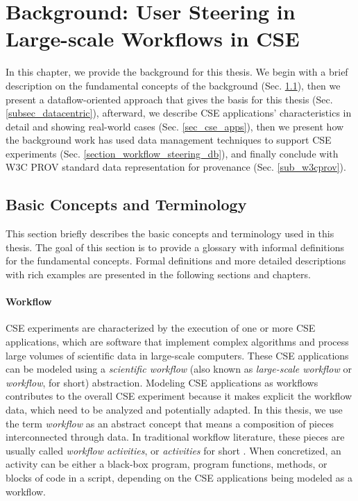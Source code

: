 \chapter{Background: User Steering in Large-scale Workflows in CSE}
\label{chap2}


In this chapter, we provide the background for this thesis.
We begin with a brief description on the fundamental concepts
of the background (Sec. \ref{chap2_sec_basic_concepts}),
then we present a dataflow-oriented approach that gives
the basis for this thesis (Sec. \ref{subsec_datacentric}),
afterward, we describe CSE applications' characteristics in detail and showing real-world cases (Sec. \ref{sec_cse_apps}), then we present how the background work
has used data management techniques to support CSE experiments (Sec. \ref{section_workflow_steering_db}), and finally conclude with W3C PROV standard data representation for provenance (Sec. \ref{sub_w3cprov}).


\section{Basic Concepts and Terminology}
\label{chap2_sec_basic_concepts}

This section briefly describes the basic concepts and terminology used in this thesis. The goal of this section is to provide a glossary with informal definitions for the fundamental concepts. Formal definitions and more detailed descriptions with rich examples are presented in the following sections and chapters.

\subsubsection{Workflow}

CSE experiments are characterized by the execution of one or more CSE applications, which are software that implement complex algorithms and process large volumes of scientific data in large-scale computers.
These CSE applications can be modeled using a \textit{scientific workflow} (also known as \textit{large-scale workflow} or \textit{workflow}, for short) abstraction.
Modeling CSE applications as workflows contributes to the overall CSE experiment because it makes explicit the workflow data, which need 
to be analyzed and potentially adapted.
In this thesis, we use the term \textit{workflow} as an abstract concept that means a composition of pieces interconnected through data. In traditional workflow literature, these pieces are usually called \textit{workflow activities}, or \textit{activities} for short \cite{F.daSilva2017characterization}. When concretized, an activity can be either a black-box program, program functions, methods, or blocks of code in a script, depending on the CSE applications being modeled as a workflow.

